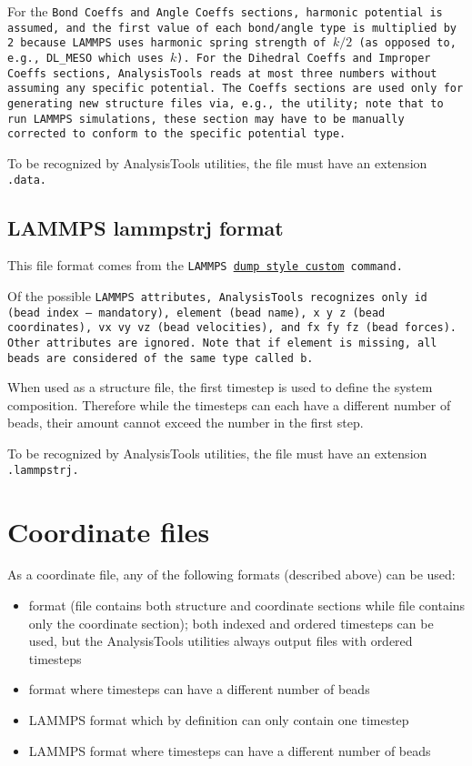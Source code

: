 For the \tt{Bond Coeffs} and \tt{Angle Coeffs} sections, harmonic potential is
assumed, and the first value of each bond/angle type is multiplied by 2 because
LAMMPS uses harmonic spring strength of $k/2$ (as opposed to, e.g., DL_MESO
which uses $k$). For the \tt{Dihedral Coeffs} and \tt{Improper Coeffs} sections,
AnalysisTools reads at most three numbers without assuming any specific
potential. The \tt{Coeffs} sections are used only for generating new structure
files via, e.g., the  utility; note that to run \tt{LAMMPS}
simulations, these section may have to be manually corrected to conform to the
specific potential type.

To be recognized by AnalysisTools utilities, the file must have an extension
\tt{.data}. %

\subsection{LAMMPS lammpstrj format}\label{ssec:StructLtrj} %

This file format comes from the \tt{LAMMPS}
\href{https://docs.lammps.org/dump.html}{dump style custom} command.

Of the possible \tt{LAMMPS} attributes, AnalysisTools recognizes only \tt{id}
(bead index -- mandatory), \tt{element} (bead name), \tt{x y z} (bead
coordinates), \tt{vx vy vz} (bead velocities), and \tt{fx fy fz} (bead forces).
Other attributes are ignored. Note that if \tt{element} is missing, all beads
are considered of the same type called \tt{b}.

When used as a structure file, the first timestep is used to define the system
composition. Therefore while the timesteps can each have a different number of
beads, their amount cannot exceed the number in the first step.

To be recognized by AnalysisTools utilities, the file must have an extension
\tt{.lammpstrj}. %

\section{Coordinate files}\label{sec:CoorFile}
As a coordinate file, any of the following formats (described above) can be
used:
\begin{itemize}
  \item \vtcf format (\vtf file contains both structure and coordinate sections
    while \vcf file contains only the coordinate section); both indexed and
    ordered timesteps can be used, but the AnalysisTools utilities always output
    files with ordered timesteps
  \item \xyz format where timesteps can have a different number of beads
  \item LAMMPS \data format which by definition can only contain one timestep
  \item LAMMPS \ltrj format where timesteps can have a different number of beads
\end{itemize}

